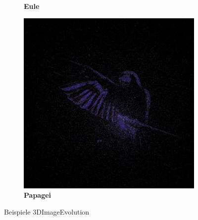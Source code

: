 \documentclass[../mciAusarbeitung.tex]{subfiles}
\begin{document}
\begin{figure}[H]
\begin{subfigure}{0.5\linewidth}
		\caption[Eule]{\textbf{Eule}}  
		 \end{subfigure}
		\begin{subfigure}{0.5\linewidth}
 		\includegraphics[width=0.95\linewidth]{"img/3dimageevolution_parrot.jpg"}
		\caption[Papagei]{\textbf{Papagei}}
		\end{subfigure} 
		\caption[BWinzen:Beispiele 3DImageEvolution]{Beispiele 3DImageEvolution}
	\end{figure}
\end{document}
